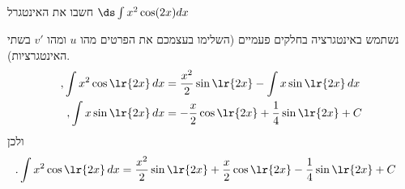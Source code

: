 חשבו את האינטגרל
$\ds \int x^2\cos(2x)dx$
\begin{solbox}
נשתמש באינטגרציה בחלקים פעמיים
(השלימו בעצמכם את הפרטים מהו
$u$
ומהו
$v'$
בשתי האינטגרציות).
\begin{align*}
,\int x^2\cos\lr{2x}\,dx
&=\frac{x^2}{2}\sin\lr{2x}-\int x\sin\lr{2x}\,dx\\
,\int x\sin\lr{2x}\,dx
&=-\frac{x}{2}\cos\lr{2x}+\frac14\sin\lr{2x}+C
\end{align*}
ולכן
\begin{align*}
.\int x^2\cos\lr{2x}\,dx
&=\frac{x^2}{2}\sin\lr{2x}+\frac{x}{2}\cos\lr{2x}-\frac14\sin\lr{2x}+C
\end{align*}
\end{solbox}
